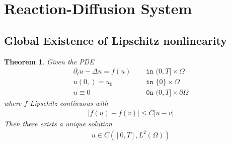 \documentclass[a4paper,11pt,oneside,fleqn]{book}
\newtheorem{theorem}{Theorem}[section]
\theoremstyle{definition}
\theoremstyle{remark}
\begin{document}
\section{Reaction-Diffusion System}
\subsection{Global Existence of Lipschitz nonlinearity}
\begin{theorem}
Given the PDE
\begin{align*}
	\partial_t u - \Delta u = f(u) \quad &\texttt{ in } (0, T] \times \Omega\\
	u(0, ) = u_0 \quad &\texttt{ in } \{0\} \times \Omega\\
	u \equiv 0 \quad &\texttt{ 0n } (0, T] \times \partial\Omega
\end{align*}
where $f$ Lipschitz continuous with
\begin{align*}
	|f(u) - f(v)| \le C |u - v|
\end{align*}
Then there exists a unique solution 
\begin{align*}
	u \in C([0, T], L^2(\Omega))
\end{align*}
\end{theorem}
\end{document}
